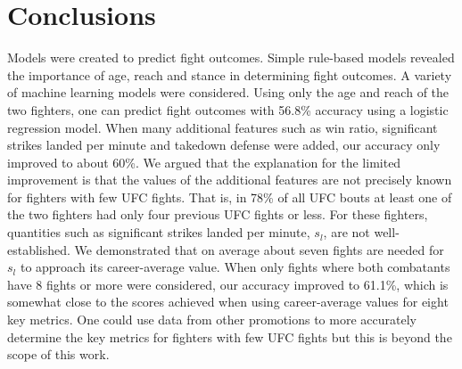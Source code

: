 \clearpage
\section{Conclusions}

Models were created to predict fight outcomes. Simple rule-based models
revealed the importance of
age, reach and stance in determining fight outcomes.
A variety of machine learning models were considered.
Using only the age and reach of the two fighters, one can predict
fight outcomes with
56.8\% accuracy using a logistic regression model. When many additional
features such as win ratio,
significant strikes landed per minute and takedown defense were
added, our accuracy only improved to about 60\%.
We argued that the explanation
for the limited improvement is that the values
of the additional features are not precisely known for fighters
with few UFC fights. That is,
in 78\% of all UFC bouts at least one of the two fighters
had only four previous UFC fights or less. For these 
fighters, quantities such
as significant strikes landed per minute, $s_l$, are not well-established.
We demonstrated that on average about seven fights
are needed for $s_l$ to approach its career-average value. When
only fights where both combatants have 8 fights or more were
considered, our accuracy improved to 61.1\%, which is somewhat
close to the scores achieved when using career-average values
for eight key metrics. One could use data from other
promotions to more accurately determine the
key metrics for fighters with few UFC fights but
this is beyond the scope of this work.
